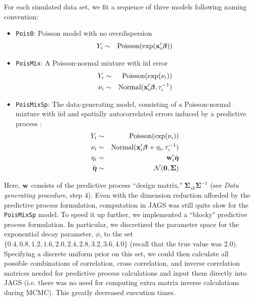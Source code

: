 \documentclass[12pt,fleqn]{article}
\def\bfx{{\bf x}}
\def\bfeta{\boldsymbol{\eta}}
\def\bfbeta{\boldsymbol{\beta}}
\def\bfSigma{\boldsymbol{\Sigma}}
\begin{document}
\begin{flushleft}
For each simulated data set, we fit a sequence of three models following naming convention:
      \begin{itemize}
        \item \texttt{Pois0}: Poisson model with no overdispersion
         \begin{eqnarray*}
           Y_i & \sim & \textrm{Poisson}(\exp(\bfx_i^\prime \bfbeta)) \\
         \end{eqnarray*}
        \item \texttt{PoisMix}: A Poisson-normal mixture with iid error
         \begin{eqnarray*}
           Y_i & \sim & \textrm{Poisson}(\exp(\nu_i)) \\
           \nu_i & \sim & \textrm{Normal}(\bfx_i^\prime \bfbeta, \tau_\epsilon^{-1})\\
          \end{eqnarray*}
        \item \texttt{PoisMixSp}: The data-generating model, consisting of a Poisson-normal mixture with iid and spatially autocorrelated errors induced by a predictive process \citep[cf.][]{BanerjeeEtAl2008}:
          \begin{eqnarray*}
           Y_i & \sim & \textrm{Poisson}(\exp(\nu_i)) \\
           \nu_i & \sim & \textrm{Normal}(\bfx_i^\prime \bfbeta + \eta_i, \tau_\epsilon^{-1}) \\
           \eta_i & = & {\bf w}_i^\prime \tilde{\bfeta} \\
           \tilde{\bfeta} & \sim & \mathcal{N}(\textbf{0},\bfSigma) \\
          \end{eqnarray*}
      \end{itemize}
Here, ${\bf w}$ consists of the predictive process ``design matrix," $\bfSigma_{sk} \bfSigma^{-1}$ (see \textit{Data generating procedure}, step 4).  Even with the dimension reduction afforded by the predictive process formulation, computation in JAGS was still quite slow for the \texttt{PoisMixSp} model.  To speed it up further, we implemented a ``blocky" predictive process formulation.  In particular, we discretized the parameter space for the exponential decay parameter, $\phi$, to the set $\{0.4, 0.8, 1.2, 1.6, 2.0, 2.4, 2.8, 3.2, 3.6, 4.0\}$ (recall that the true value was 2.0).  Specifying a discrete uniform prior on this set, we could then calculate all possible combinations of correlation, cross correlation, and inverse correlation matrices needed for predictive process calculations and input them directly into JAGS (i.e. there was no need for computing extra matrix inverse calculations during MCMC).  This greatly decreased execution times.


\end{flushleft}
\end{document}
